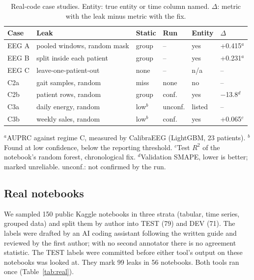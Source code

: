 \documentclass[10pt,a4paper,twocolumn]{article}
\begin{document}
\begin{table}[t]
\caption{Real-code case studies. Entity: true entity or time column named. $\Delta$: metric with the leak minus
metric with the fix.}
\label{tab:cases}
\footnotesize
\setlength{\tabcolsep}{2.2pt}
\begin{tabularx}{\columnwidth}{@{}l>{\raggedright\arraybackslash}Xllll@{}}
\toprule
\textbf{Case} & \textbf{Leak} & \textbf{Static} & \textbf{Run} & \textbf{Entity} & \textbf{$\Delta$} \\
\midrule
EEG A & pooled windows, random mask & group & -- & yes & +0.415$^{a}$ \\
EEG B & split inside each patient & group & -- & yes & +0.231$^{a}$ \\
EEG C & leave-one-patient-out & none & -- & n/a & -- \\
C2a & gait samples, random & miss & none & no & -- \\
C2b & patient rows, random & group & conf. & yes & $-$13.8$^{d}$ \\
C3a & daily energy, random & low$^{b}$ & unconf. & listed & -- \\
C3b & weekly sales, random & low$^{b}$ & conf. & yes & +0.065$^{c}$ \\
\bottomrule
\end{tabularx}

\vspace{2pt}
\raggedright $^{a}$AUPRC against regime C, measured by CalibraEEG (LightGBM, 23 patients). $^{b}$Found at low confidence, below the reporting threshold. $^{c}$Test $R^2$ of the notebook's random
forest, chronological fix. $^{d}$Validation SMAPE, lower is better; marked unreliable.
unconf.: not confirmed by the run.
\end{table}

\subsection{Real notebooks}

We sampled 150 public Kaggle notebooks in three strata (tabular, time series, grouped data) and split them by
author into TEST (79) and DEV (71). The labels were drafted by an AI coding assistant following the
written guide and reviewed by the first author; with no second annotator there is no agreement statistic. The TEST labels were committed before either tool's output on these
notebooks was looked at. They mark 99 leaks in 56 notebooks. Both tools ran once (Table~\ref{tab:real}).
\end{document}
